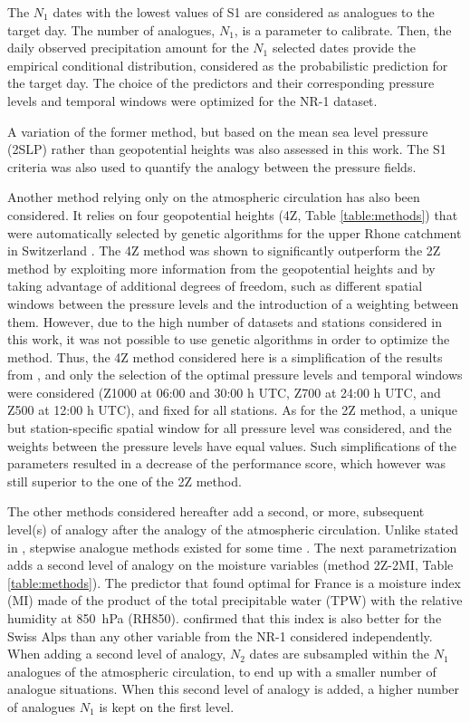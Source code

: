 \documentclass{ametsoc}
\begin{document}
The $N_{1}$ dates with the lowest values of S1 are considered as analogues to the target day. The number of analogues, $N_{1}$, is a parameter to calibrate. Then, the daily observed precipitation amount for the $N_{1}$ selected dates provide the empirical conditional distribution, considered as the probabilistic prediction for the target day. The choice of the predictors and their corresponding pressure levels and temporal windows were optimized for the NR-1 dataset.

A variation of the former method, but based on the mean sea level pressure (2SLP) rather than geopotential heights was also assessed in this work. The S1 criteria was also used to quantify the analogy between the pressure fields.

Another method relying only on the atmospheric circulation has also been considered. It relies on four geopotential heights (4Z, Table \ref{table:methods}) that were automatically selected by genetic algorithms for the upper Rhone catchment in Switzerland \citep{Horton2017b}. The 4Z method was shown to significantly outperform the 2Z method by exploiting more information from the geopotential heights and by taking advantage of additional degrees of freedom, such as different spatial windows between the pressure levels and the introduction of a weighting between them. However, due to the high number of datasets and stations considered in this work, it was not possible to use genetic algorithms in order to optimize the method. Thus, the 4Z method considered here is a simplification of the results from \citet{Horton2017b}, and only the selection of the optimal pressure levels and temporal windows were considered (Z1000 at 06:00 and 30:00 h UTC, Z700 at 24:00 h UTC, and Z500 at 12:00 h UTC), and fixed for all stations. As for the 2Z method, a unique but station-specific spatial window for all pressure level was considered, and the weights between the pressure levels have equal values. Such simplifications of the parameters resulted in a decrease of the performance score, which however was still superior to the one of the 2Z method.

The other methods considered hereafter add a second, or more, subsequent level(s) of analogy after the analogy of the atmospheric circulation. Unlike stated in \citet{Caillouet2016}, stepwise analogue methods existed for some time \citep[e.g.][]{Bontron2004, Bontron2005, Marty2010, Marty2012, Horton2012a}. The next parametrization adds a second level of analogy on the moisture variables (method 2Z-2MI, Table \ref{table:methods}). The predictor that \citet{Bontron2004} found optimal for France is a moisture index (MI) made of the product of the total precipitable water (TPW) with the relative humidity at 850~hPa (RH850). \cite{Horton2012a} confirmed that this index is also better for the Swiss Alps than any other variable from the NR-1 considered independently. When adding a second level of analogy, $N_{2}$ dates are subsampled within the $N_{1}$ analogues of the atmospheric circulation, to end up with a smaller number of analogue situations. When this second level of analogy is added, a higher number of analogues $N_{1}$ is kept on the first level. 
\end{document}
